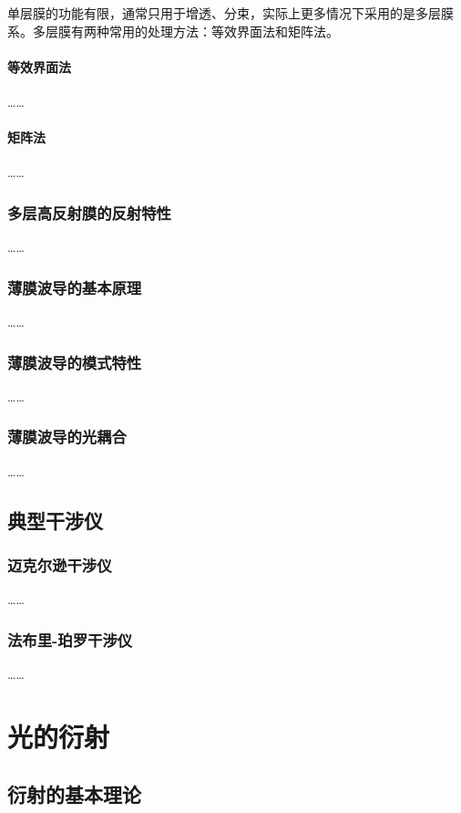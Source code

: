 \documentclass[cn,10pt,chinesefont=founder,math=mtpro2,cite=super,toc=onecol,twoside]{elegantbook}
\begin{document}
单层膜的功能有限，通常只用于增透、分束，实际上更多情况下采用的是多层膜系。多层膜有两种常用的处理方法：等效界面法和矩阵法。

\subsubsection{等效界面法}
……

\subsubsection{矩阵法}
……

\subsection{多层高反射膜的反射特性}
……


\subsection{薄膜波导的基本原理}
……

\subsection{薄膜波导的模式特性}
……

\subsection{薄膜波导的光耦合}
……

\section{典型干涉仪}

\subsection{迈克尔逊干涉仪}
……

\subsection{法布里-珀罗干涉仪}
……

\chapter{光的衍射}

\section{衍射的基本理论}
\end{document}
